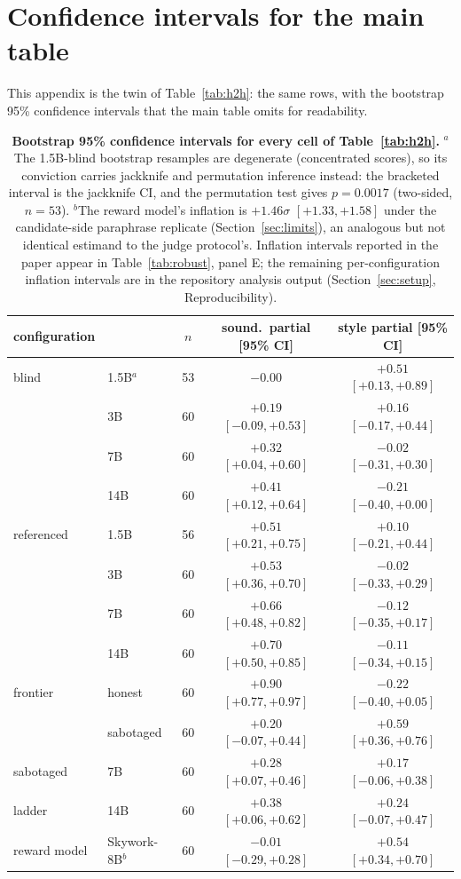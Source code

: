 \appendix

\section{Confidence intervals for the main table}
\label{app:citable}
This appendix is the twin of Table~\ref{tab:h2h}: the same rows, with the bootstrap 95\% confidence intervals that the main table omits for readability.

\begin{table}[ht]
\centering
\small
\setlength{\tabcolsep}{4pt}
\begin{tabular}{llccc}
\toprule
configuration & & $n$ & sound.\ partial [95\% CI] & style partial [95\% CI] \\
\midrule
blind & 1.5B$^{a}$ & 53 & $-0.00$ & $+0.51$ $[+0.13, +0.89]$ \\
& 3B & 60 & $+0.19$ $[-0.09,+0.53]$ & $+0.16$ $[-0.17,+0.44]$ \\
& 7B & 60 & $+0.32$ $[+0.04,+0.60]$ & $-0.02$ $[-0.31,+0.30]$ \\
& 14B & 60 & $+0.41$ $[+0.12,+0.64]$ & $-0.21$ $[-0.40,+0.00]$ \\
\midrule
referenced & 1.5B & 56 & $+0.51$ $[+0.21,+0.75]$ & $+0.10$ $[-0.21,+0.44]$ \\
& 3B & 60 & $+0.53$ $[+0.36,+0.70]$ & $-0.02$ $[-0.33,+0.29]$ \\
& 7B & 60 & $+0.66$ $[+0.48,+0.82]$ & $-0.12$ $[-0.35,+0.17]$ \\
& 14B & 60 & $+0.70$ $[+0.50,+0.85]$ & $-0.11$ $[-0.34,+0.15]$ \\
\midrule
frontier & honest & 60 & $+0.90$ $[+0.77,+0.97]$ & $-0.22$ $[-0.40,+0.05]$ \\
& sabotaged & 60 & $+0.20$ $[-0.07,+0.44]$ & $+0.59$ $[+0.36,+0.76]$ \\
\midrule
sabotaged & 7B & 60 & $+0.28$ $[+0.07,+0.46]$ & $+0.17$ $[-0.06,+0.38]$ \\
ladder & 14B & 60 & $+0.38$ $[+0.06,+0.62]$ & $+0.24$ $[-0.07,+0.47]$ \\
\midrule
reward model & Skywork-8B$^{b}$ & 60 & $-0.01$ $[-0.29,+0.28]$ & $+0.54$ $[+0.34,+0.70]$ \\
\bottomrule
\end{tabular}
\caption{\textbf{Bootstrap 95\% confidence intervals for every cell of Table~\ref{tab:h2h}.}
$^{a}$The 1.5B-blind bootstrap resamples are degenerate (concentrated scores), so its conviction carries jackknife and permutation inference instead: the bracketed interval is the jackknife CI, and the permutation test gives $p = 0.0017$ (two-sided, $n{=}53$).
$^{b}$The reward model's inflation is $+1.46\sigma$ $[+1.33, +1.58]$ under the candidate-side paraphrase replicate (Section~\ref{sec:limits}), an analogous but not identical estimand to the judge protocol's.
Inflation intervals reported in the paper appear in Table~\ref{tab:robust}, panel E; the remaining per-configuration inflation intervals are in the repository analysis output (Section~\ref{sec:setup}, Reproducibility).}
\label{tab:h2h_ci}
\end{table}

